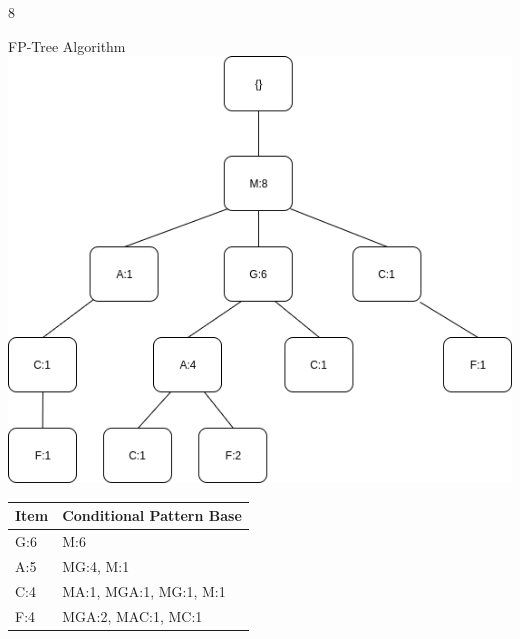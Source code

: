 \documentclass{article}
\begin{document}
\begin{ukon-infie}[10.01.18]{8}
\begin{exercise}[p=2+2+1+1]{FP-Tree Algorithm}
\includegraphics[scale=0.5]{FPtree.png}

		\question{}
		{
		\begin{tabular}{|l|l|}
\hline
Item & Conditional Pattern Base \\ \hline
G:6  & M:6                      \\ \hline
A:5  & MG:4, M:1                \\ \hline
C:4  & MA:1, MGA:1, MG:1, M:1   \\ \hline
F:4  & MGA:2, MAC:1, MC:1       \\ \hline
\end{tabular}
		}

		\end{exercise}
		
		
\end{ukon-infie}
\end{document}
